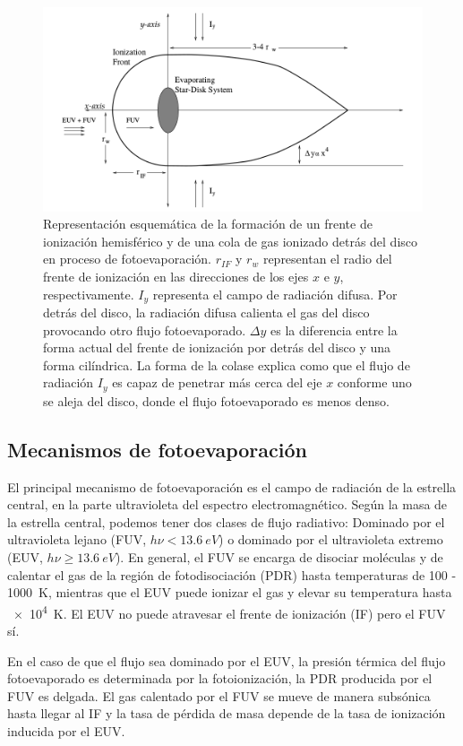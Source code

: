 \begin{figure}
  \includegraphics[width=0.8\linewidth]{./Figures/Johnstone-shape}
  \caption{Representación esquemática de la formación de un frente de ionización hemisférico y de una cola de gas ionizado detrás del disco en proceso de fotoevaporación. $r_{IF}$ y $r_w$ representan el radio del frente de ionización en las direcciones de los ejes $x$ e $y$, respectivamente. $I_y$ representa el campo de radiación difusa. Por detrás del disco, la radiación difusa calienta el gas del disco provocando otro flujo fotoevaporado. $\Delta y$ es la diferencia entre la forma actual del frente de ionización por detrás del disco y una forma cilíndrica. La forma de la colase explica como que el flujo de radiación $I_y$ es capaz de penetrar más cerca del eje $x$ conforme uno se aleja del disco, donde el flujo fotoevaporado es menos denso.}
    \label{fig:prop-shape}
\end{figure}


\subsection{Mecanismos de fotoevaporación \citep{Johnstone:1998}}

El principal mecanismo de fotoevaporación es el campo de radiación de la estrella central, en la parte ultravioleta del espectro electromagnético. Según la masa de la estrella central, podemos tener dos clases de flujo radiativo: Dominado por el ultravioleta lejano (FUV, $h\nu < \SI{13.6}{eV}$) o dominado por el ultravioleta extremo (EUV, $h\nu \geq \SI{13.6}{eV}$). En general, el FUV se encarga de disociar moléculas y de calentar el gas de la región de fotodisociación (PDR) hasta temperaturas de \SI{100}{} - \SI{1000}{K}, mientras que el EUV puede ionizar el gas y elevar su temperatura hasta \SI{e4}{K}. El EUV no puede atravesar el frente de ionización (IF) pero el FUV sí.

En el caso de que el flujo sea dominado por el EUV, la presión térmica del flujo fotoevaporado es determinada por la fotoionización, la PDR producida por el FUV es delgada. El gas calentado por el FUV se mueve de manera subsónica hasta llegar al IF y la tasa de pérdida de masa depende de la tasa de ionización inducida por el EUV.

